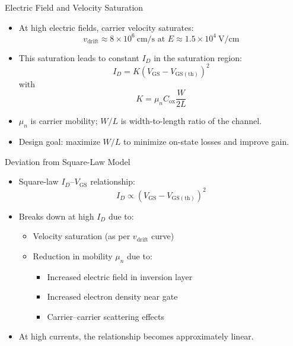 \begin{frame}{Electric Field and Velocity Saturation}
\begin{itemize}
    \item At high electric fields, carrier velocity saturates:
    \[
        v_{\mathrm{drift}} \approx 8 \times 10^6~\text{cm/s at } E \approx 1.5 \times 10^4~\text{V/cm}
    \]
    \item This saturation leads to constant $I_D$ in the saturation region:
    \[
        I_D = K (V_{\mathrm{GS}} - V_{\mathrm{GS(th)}})^2
    \]
    with 
    \[
        K = \mu_n C_{\mathrm{ox}} \frac{W}{2L}
    \]
    \item $\mu_n$ is carrier mobility; $W/L$ is width-to-length ratio of the channel.
    \item Design goal: maximize $W/L$ to minimize on-state losses and improve gain.
\end{itemize}
\end{frame}


\begin{frame}{Deviation from Square-Law Model}
\begin{itemize}
    \item Square-law $I_D$–$V_{\mathrm{GS}}$ relationship:
    \[
        I_D \propto (V_{\mathrm{GS}} - V_{\mathrm{GS(th)}})^2
    \]
    \item Breaks down at high $I_D$ due to:
    \begin{itemize}
        \item Velocity saturation (as per $v_{\mathrm{drift}}$ curve)
        \item Reduction in mobility $\mu_n$ due to:
        \begin{itemize}
            \item Increased electric field in inversion layer
            \item Increased electron density near gate
            \item Carrier–carrier scattering effects
        \end{itemize}
    \end{itemize}
    \item At high currents, the relationship becomes approximately linear.
\end{itemize}
\end{frame}

